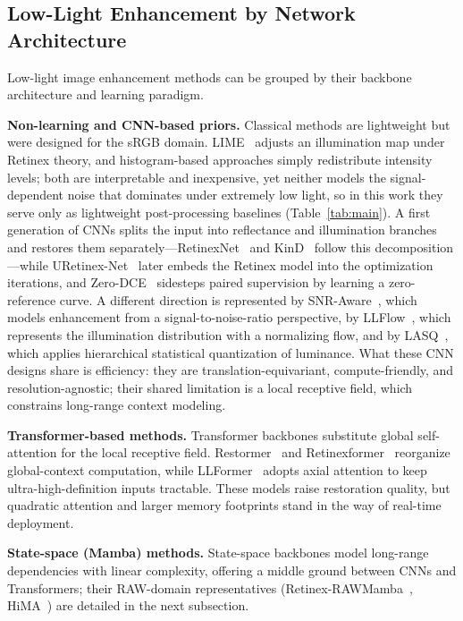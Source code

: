 \documentclass[remotesensing,article,accept,moreauthors]{Definitions/mdpi}
\begin{document}
\subsection{Low-Light Enhancement by Network Architecture}

Low-light image enhancement methods can be grouped by their backbone architecture and learning paradigm.

\textbf{Non-learning and CNN-based priors.} Classical methods are lightweight but were designed for the sRGB domain. LIME~\citep{guo2017lime} adjusts an illumination map under Retinex theory, and histogram-based approaches simply redistribute intensity levels; both are interpretable and inexpensive, yet neither models the signal-dependent noise that dominates under extremely low light, so in this work they serve only as lightweight post-processing baselines (Table~\ref{tab:main}). A first generation of CNNs splits the input into reflectance and illumination branches and restores them separately---RetinexNet~\citep{wei2018retinexnet} and KinD~\citep{zhang2019kind} follow this decomposition---while URetinex-Net~\citep{wu2022uretex} later embeds the Retinex model into the optimization iterations, and Zero-DCE~\citep{guo2020zerodce} sidesteps paired supervision by learning a zero-reference curve. A different direction is represented by SNR-Aware~\citep{xu2022snraware}, which models enhancement from a signal-to-noise-ratio perspective, by LLFlow~\citep{wang2022llflow}, which represents the illumination distribution with a normalizing flow, and by LASQ~\citep{kong2025lasq}, which applies hierarchical statistical quantization of luminance. What these CNN designs share is efficiency: they are translation-equivariant, compute-friendly, and resolution-agnostic; their shared limitation is a local receptive field, which constrains long-range context modeling.

\textbf{Transformer-based methods.} Transformer backbones substitute global self-attention for the local receptive field. Restormer~\citep{zamir2022restormer} and Retinexformer~\citep{cai2023retinexformer} reorganize global-context computation, while LLFormer~\citep{wang2023llformer} adopts axial attention to keep ultra-high-definition inputs tractable. These models raise restoration quality, but quadratic attention and larger memory footprints stand in the way of real-time deployment.

\textbf{State-space (Mamba) methods.} State-space backbones model long-range dependencies with linear complexity, offering a middle ground between CNNs and Transformers; their RAW-domain representatives (Retinex-RAWMamba~\citep{chen2024rawmamba}, HiMA~\citep{chen2025hima}) are detailed in the next subsection.
\end{document}
